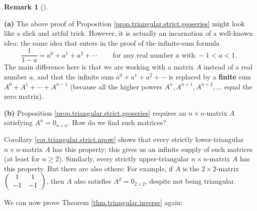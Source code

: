 \documentclass[numbers=enddot,12pt,final,onecolumn,notitlepage]{scrartcl}%
\theoremstyle{definition}
\newtheorem{remk}[theo]{Remark}
\newenvironment{remark}[1][]
{\begin{remk}[#1]\begin{leftbar}}
{\end{leftbar}\end{remk}}
\begin{document}
\begin{remark}
\textbf{(a)} The above proof of Proposition
\ref{prop.triangular.strict.geoseries} might look like a slick and artful
trick. However, it is actually an incarnation of a well-known idea: the same
idea that enters in the proof of the infinite-sum formula%
\[
\dfrac{1}{1-a}=a^{0}+a^{1}+a^{2}+\cdots\ \ \ \ \ \ \ \ \ \ \text{for any real
number }a\text{ with }-1<a<1.
\]
The main difference here is that we are working with a matrix $A$ instead of a
real number $a$, and that the infinite sum $a^{0}+a^{1}+a^{2}+\cdots$ is
replaced by a \textbf{finite} sum $A^{0}+A^{1}+\cdots+A^{n-1}$ (because all
the higher powers $A^{n},A^{n+1},A^{n+2},\ldots$ equal the zero matrix).

\textbf{(b)} Proposition \ref{prop.triangular.strict.geoseries} requires an
$n\times n$-matrix $A$ satisfying $A^{n}=0_{n\times n}$. How do we find such matrices?

Corollary \ref{cor.triangular.strict.npow} shows that every strictly
lower-triangular $n\times n$-matrix $A$ has this property; this gives us an
infinite supply of such matrices (at least for $n\geq2$). Similarly, every
strictly upper-triangular $n\times n$-matrix $A$ has this property. But there
are also others: For example, if $A$ is the $2\times2$-matrix $\left(
\begin{array}
[c]{cc}%
1 & 1\\
-1 & -1
\end{array}
\right)  $, then $A$ also satisfies $A^{2}=0_{2\times2}$, despite not being triangular.
\end{remark}

We can now prove Theorem \ref{thm.triangular.inverse} again:
\end{document}
